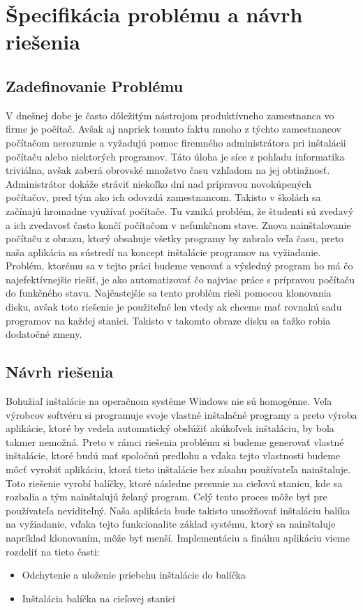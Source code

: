 \chapter{Špecifikácia problému a návrh riešenia}

\section{Zadefinovanie Problému}
V dnešnej dobe je často dôležitým nástrojom produktívneho zamestnanca vo firme je počítač. Avšak aj napriek tomuto faktu mnoho z týchto zamestnancov počítačom nerozumie a vyžadujú pomoc firemného administrátora pri inštalácii počítaču alebo niektorých programov. Táto úloha je síce z pohľadu informatika triviálna, avšak zaberá obrovské množstvo času vzhľadom na jej obtiažnosť. Administrátor dokáže stráviť niekoľko dní nad prípravou novokúpených  počítačov, pred tým ako ich odovzdá zamestnancom.
Takisto v školách sa začínajú hromadne využívať počítače. Tu vzniká problém, že študenti sú zvedavý a ich zvedavosť často končí počítačom v nefunkčnom stave. Znova nainštalovanie počítaču z obrazu, ktorý obsahuje všetky programy by zabralo veľa času, preto naša aplikácia sa sústredí na koncept inštalácie programov na vyžiadanie.
Problém, ktorému sa v tejto práci budeme venovať a výsledný program ho má čo najefektívnejšie riešiť, je ako automatizovať čo najviac práce s prípravou počítaču do funkčného stavu. Najčastejšie sa tento problém rieši pomocou klonovania disku, avšak toto riešenie je použiteľné len vtedy ak chceme mať rovnakú sadu programov na každej stanici. Takisto v takomto obraze disku sa ťažko robia dodatočné zmeny.

\section{Návrh riešenia}
Bohužiaľ inštalácie na operačnom systéme Windows nie sú homogénne. Veľa výrobcov softvéru si programuje svoje vlastné inštalačné programy a preto výroba aplikácie, ktoré by vedela automatický obslúžiť akúkoľvek inštaláciu, by bola takmer nemožná. Preto v rámci riešenia problému si budeme generovať vlastné inštalácie, ktoré budú mať spoločnú predlohu a vďaka tejto vlastnosti budeme môcť vyrobiť aplikáciu, ktorá tieto inštalácie bez zásahu používateľa nainštaluje.  Toto riešenie vyrobí balíčky, ktoré následne presunie na cieľovú stanicu, kde sa rozbalia a tým nainštalujú želaný program. Celý tento proces môže byť pre používateľa neviditeľný. Naša aplikácia bude takisto umožňovať inštaláciu balíka na vyžiadanie, vďaka tejto funkcionalite základ systému, ktorý sa nainštaluje napríklad klonovaním, môže byť menší. Implementáciu a finálnu aplikáciu vieme rozdeliť na tieto časti:
\begin{itemize}
\item Odchytenie a uloženie priebehu inštalácie do balíčka
\item Inštalácia balíčka na cieľovej stanici
\end{itemize}
 
